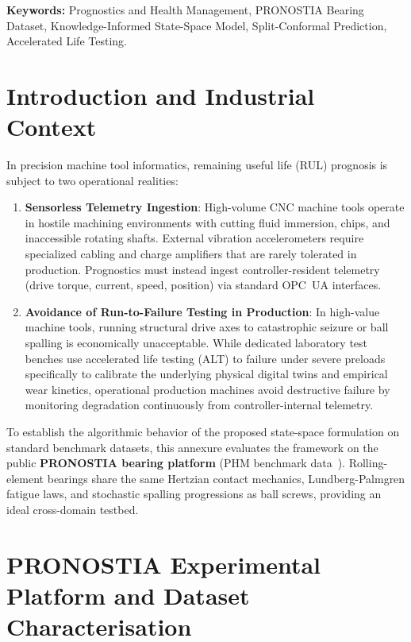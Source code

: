 \documentclass[11pt,a4paper]{article}
\begin{document}
\vspace{0.6em}
\noindent\textbf{Keywords:} Prognostics and Health Management, PRONOSTIA Bearing Dataset, Knowledge-Informed State-Space Model, Split-Conformal Prediction, Accelerated Life Testing.

\section{Introduction and Industrial Context}
\label{sec:annex_intro}

In precision machine tool informatics, remaining useful life (RUL) prognosis is subject to two operational realities:
\begin{enumerate}[label=(\alph*),leftmargin=2.2em]
    \item \textbf{Sensorless Telemetry Ingestion}: High-volume CNC machine tools operate in hostile machining environments with cutting fluid immersion, chips, and inaccessible rotating shafts. External vibration accelerometers require specialized cabling and charge amplifiers that are rarely tolerated in production. Prognostics must instead ingest controller-resident telemetry (drive torque, current, speed, position) via standard OPC~UA interfaces.
    \item \textbf{Avoidance of Run-to-Failure Testing in Production}: In high-value machine tools, running structural drive axes to catastrophic seizure or ball spalling is economically unacceptable. While dedicated laboratory test benches use accelerated life testing (ALT) to failure under severe preloads specifically to calibrate the underlying physical digital twins and empirical wear kinetics, operational production machines avoid destructive failure by monitoring degradation continuously from controller-internal telemetry.
\end{enumerate}

To establish the algorithmic behavior of the proposed state-space formulation on standard benchmark datasets, this annexure evaluates the framework on the public \textbf{PRONOSTIA bearing platform} (PHM benchmark data~\cite{Lei_2018}). Rolling-element bearings share the same Hertzian contact mechanics, Lundberg-Palmgren fatigue laws, and stochastic spalling progressions as ball screws, providing an ideal cross-domain testbed.

\section{PRONOSTIA Experimental Platform and Dataset Characterisation}
\label{sec:annex_setup}
\end{document}
